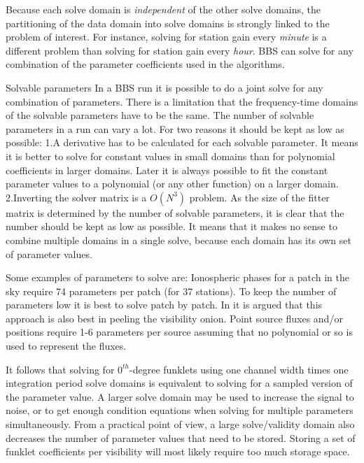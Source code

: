 \documentclass[10pt]{lofar}
\newcommand{\todo}[1]{\begin{center}\fbox{\parbox{0.9\textwidth}{\textbf{!!TODO!! #1}}}\end{center}}
\begin{document}

Because each solve domain is \emph{independent} of the other solve domains, the
partitioning of the data domain into solve domains is strongly linked to the
problem of interest. For instance, solving for station gain every \emph{minute}
is a different problem than solving for station gain every \emph{hour}.
BBS can solve for any combination of the parameter coefficients used in the algorithms.

Solvable parameters
In a BBS run it is possible to do a joint solve for any combination of parameters. There is a limitation that the frequency-time domains of the solvable parameters have to be the same.
The number of solvable parameters in a run can vary a lot. For two reasons it should be kept as low as possible:
1.A derivative has to be calculated for each solvable parameter. It means it is better to solve for constant values in small domains than for polynomial coefficients in larger domains. Later it is always possible to fit the constant parameter values to a polynomial (or any other function) on a larger domain.
2.Inverting the solver matrix is a $O(N^3)$ problem. As the size of the fitter matrix is determined by the number of solvable parameters, it is clear that the number should be kept as low as possible.
It means that it makes no sense to combine multiple domains in a single solve, because each domain has its own set of parameter values.

Some examples of parameters to solve are:
Ionospheric phases for a patch in the sky require 74 parameters per patch (for 37 stations).
To keep the number of parameters low it is best to solve patch by patch. In  it is argued that this approach is also best in peeling the visibility onion.
Point source fluxes and/or positions require 1-6 parameters per source assuming that no polynomial or so is used to represent the fluxes.


It follows that solving for $0^{th}$-degree funklets using one channel width times one integration period solve domains is equivalent to solving for a sampled version of the parameter value. A larger solve domain may be used to increase the signal to noise, or to get enough condition equations when solving for multiple parameters simultaneously. From a practical point of view, a large solve/validity domain also decreases the number of parameter values that need to be stored. Storing a set of funklet coefficients per visibility will most likely require too much storage space.
\end{document}
